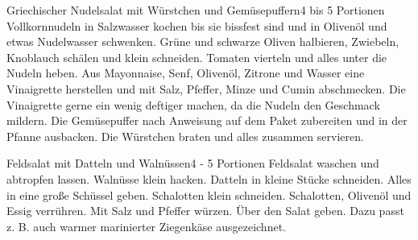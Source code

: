 \documentclass[a4paper,10pt]{article}
\begin{document}
    \begin{recipe}{Griechischer Nudelsalat mit Würstchen und Gemüsepuffern}{4 bis 5 Portionen}{}
        Vollkornnudeln in Salzwasser kochen bis sie bissfest sind und in Olivenöl und etwas Nudelwasser schwenken.
        Grüne und schwarze Oliven halbieren, Zwiebeln, Knoblauch schälen und klein schneiden. 
        Tomaten vierteln und alles unter die Nudeln heben.
        Aus Mayonnaise, Senf, Olivenöl, Zitrone und Wasser eine Vinaigrette herstellen und mit Salz,
        Pfeffer, Minze und Cumin abschmecken. Die Vinaigrette gerne ein wenig deftiger machen,
        da die Nudeln den Geschmack mildern.
        Die Gemüsepuffer nach Anweisung auf dem Paket zubereiten und in der Pfanne ausbacken.
        Die Würstchen braten und alles zusammen servieren.
    \end{recipe}
    
    \newpage
    
    \begin{recipe}{Feldsalat mit Datteln und Walnüssen}{4 - 5 Portionen}{}
        Feldsalat waschen und abtropfen lassen. Walnüsse klein hacken. Datteln 
        in kleine Stücke schneiden. Alles in eine große Schüssel geben.
        Schalotten klein schneiden. Schalotten, Olivenöl und Essig verrühren. 
	Mit Salz und Pfeffer würzen. Über den Salat geben.
	\freeform Dazu passt z. B. auch warmer marinierter Ziegenkäse 
	ausgezeichnet.
    \end{recipe}

    \newpage    
    
\end{document}
